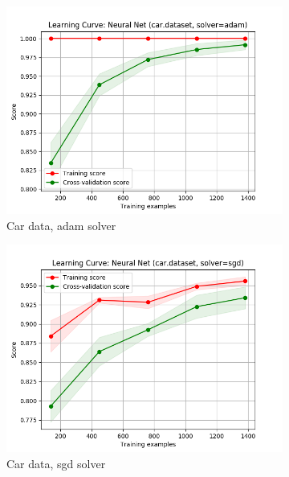 \documentclass{article}
\begin{document}
\begin{figure}[htb]
    \begin{subfigure}{0.33\textwidth}
      \includegraphics[width=\linewidth]{out/neural_net/car-solver-adam.png}
      \caption{Car data, adam solver}
      \label{fig:nn-param-1}
    \end{subfigure}\hfil
    \begin{subfigure}{0.33\textwidth}
      \includegraphics[width=\linewidth]{out/neural_net/car-solver-sgd.png}
      \caption{Car data, sgd solver}
      \label{fig:nn-param-2}
    \end{subfigure}\hfil
    \begin{subfigure}{0.33\textwidth}

\end{subfigure}
\end{figure}
\end{document}
